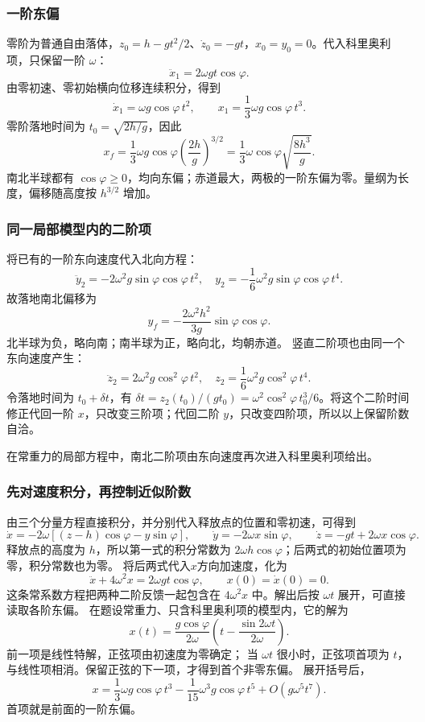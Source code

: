 \documentclass[UTF8,fontset=fandol,a4paper,11pt]{ctexart}
\begin{document}
\subsubsection*{一阶东偏}
零阶为普通自由落体，$z_0=h-gt^2/2$、$\dot z_0=-gt$，$x_0=y_0=0$。代入科里奥利项，只保留一阶 $\omega$：
\[
\ddot x_1=2\omega g t\cos\varphi.
\]
由零初速、零初始横向位移连续积分，得到
\[
\dot x_1=\omega g\cos\varphi\,t^2,
\qquad x_1=\frac13\omega g\cos\varphi\,t^3.
\]
零阶落地时间为 $t_0=\sqrt{2h/g}$，因此
\[
\boxed{x_f=\frac13\omega g\cos\varphi\left(\frac{2h}{g}\right)^{3/2}
=\frac13\omega\cos\varphi\sqrt{\frac{8h^3}{g}}}.
\]
南北半球都有 $\cos\varphi\geq0$，均向东偏；赤道最大，两极的一阶东偏为零。量纲为长度，偏移随高度按 $h^{3/2}$ 增加。

\subsubsection*{同一局部模型内的二阶项}
将已有的一阶东向速度代入北向方程：
\[
\ddot y_2=-2\omega^2g\sin\varphi\cos\varphi\,t^2,
\quad y_2=-\frac16\omega^2g\sin\varphi\cos\varphi\,t^4.
\]
故落地南北偏移为
\[
\boxed{y_f=-\frac{2\omega^2h^2}{3g}\sin\varphi\cos\varphi}.
\]
北半球为负，略向南；南半球为正，略向北，均朝赤道。
竖直二阶项也由同一个东向速度产生：
\[
\ddot z_2=2\omega^2g\cos^2\varphi\,t^2,
\quad z_2=\frac16\omega^2g\cos^2\varphi\,t^4.
\]
令落地时间为 $t_0+\delta t$，有 $\delta t=z_2(t_0)/(gt_0)=\omega^2\cos^2\varphi\,t_0^3/6$。将这个二阶时间修正代回一阶 $x$，只改变三阶项；代回二阶 $y$，只改变四阶项，所以以上保留阶数自洽。

在常重力的局部方程中，南北二阶项由东向速度再次进入科里奥利项给出。
\subsubsection*{先对速度积分，再控制近似阶数}
由三个分量方程直接积分，并分别代入释放点的位置和零初速，可得到
\[
\dot x=-2\omega[(z-h)\cos\varphi-y\sin\varphi],\qquad
\dot y=-2\omega x\sin\varphi,\qquad
\dot z=-gt+2\omega x\cos\varphi.
\]
释放点的高度为 $h$，所以第一式的积分常数为 $2\omega h\cos\varphi$；后两式的初始位置项为零，积分常数也为零。
将后两式代入$x$方向加速度，化为
\[
\ddot x+4\omega^2x=2\omega gt\cos\varphi,\qquad
x(0)=\dot x(0)=0.
\]
这条常系数方程把两种二阶反馈一起包含在 $4\omega^2x$ 中。解出后按 $\omega t$ 展开，可直接读取各阶东偏。
在题设常重力、只含科里奥利项的模型内，它的解为
\[
x(t)=\frac{g\cos\varphi}{2\omega}
\left(t-\frac{\sin2\omega t}{2\omega}\right).
\]
前一项是线性特解，正弦项由初速度为零确定；
当 $\omega t$ 很小时，正弦项首项为 $t$，与线性项相消。保留正弦的下一项，才得到首个非零东偏。
展开括号后，
\[
x=\frac13\omega g\cos\varphi\,t^3
-\frac1{15}\omega^3g\cos\varphi\,t^5+O(g\omega^5t^7).
\]
首项就是前面的一阶东偏。
\end{document}
